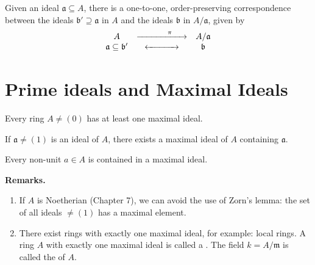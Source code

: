     \begin{theorem}
        Given an ideal \( \mathfrak{a} \subseteq A \), there is a one-to-one, order-preserving correspondence between the ideals \( \mathfrak{b}' \supseteq \mathfrak{a} \) in \( A \) and the ideals \( \mathfrak{b} \) in \( A/\mathfrak{a} \), given by
        \[
        \begin{array}{c@{\quad}c@{\quad}c}
        A & \xrightarrow{\hspace{1.2cm}\pi\hspace{0.5cm}} & A/\mathfrak{a} \\
        \mathfrak{a} \subseteq \mathfrak{b}' & \xleftrightarrow{\hspace{1.2cm}} & \mathfrak{b}
        \end{array}
        \]
    \end{theorem}

\section{Prime ideals and Maximal Ideals}

\begin{theorem}
Every ring \( A \ne (0) \) has at least one maximal ideal.
\end{theorem}

\begin{corollary}
If \( \mathfrak{a} \ne (1) \) is an ideal of \( A \), there exists a maximal ideal of \( A \) containing \( \mathfrak{a} \).
\end{corollary}

\begin{corollary}
Every non-unit \( a \in A \) is contained in a maximal ideal.
\end{corollary}

\leavevmode\vspace{0.5em} %

\textbf{Remarks.}

\begin{enumerate}
    \item If \( A \) is Noetherian (Chapter 7), we can avoid the use of Zorn’s lemma: the set of all ideals \( \ne (1) \) has a maximal element.
    \item There exist rings with exactly one maximal ideal, for example: local rings. A ring \( A \) with exactly one maximal ideal is called a . The field \( k = A / \mathfrak{m} \) is called the  of \( A \).
\end{enumerate}

